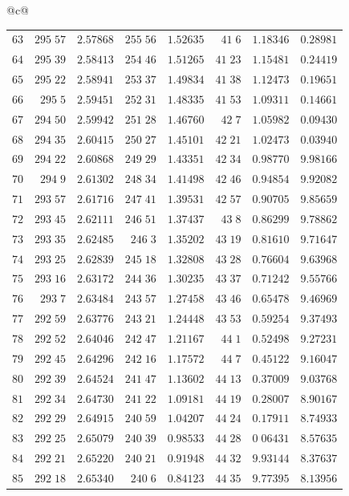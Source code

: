 \begin{center}
{\begin{tabular}{@{}c@{}}
\begin{tabular}{r|r|r|r|r|r|r|r}
$63$&$295\;57$&$2.57868$&$255\;56$&$1.52635$&$41\;6$&$1.18346$&$0.28981$\\
$64$&$295\;39$&$2.58413$&$254\;46$&$1.51265$&$41\;23$&$1.15481$&$0.24419$\\[2pt]
$65$&$295\;22$&$2.58941$&$253\;37$&$1.49834$&$41\;38$&$1.12473$&$0.19651$\\
$66$&$295\;5$&$2.59451$&$252\;31$&$1.48335$&$41\;53$&$1.09311$&$0.14661$\\
$67$&$294\;50$&$2.59942$&$251\;28$&$1.46760$&$42\;7$&$1.05982$&$0.09430$\\
$68$&$294\;35$&$2.60415$&$250\;27$&$1.45101$&$42\;21$&$1.02473$&$0.03940$\\
$69$&$294\;22$&$2.60868$&$249\;29$&$1.43351$&$42\;34$&$0.98770$&$9.98166$\\[2pt]
$70$&$294\;9$&$2.61302$&$248\;34$&$1.41498$&$42\;46$&$0.94854$&$9.92082$\\
$71$&$293\;57$&$2.61716$&$247\;41$&$1.39531$&$42\;57$&$0.90705$&$9.85659$\\
$72$&$293\;45$&$2.62111$&$246\;51$&$1.37437$&$43\;8$&$0.86299$&$9.78862$\\
$73$&$293\;35$&$2.62485$&$246\;3$&$1.35202$&$43\;19$&$0.81610$&$9.71647$\\
$74$&$293\;25$&$2.62839$&$245\;18$&$1.32808$&$43\;28$&$0.76604$&$9.63968$\\[2pt]
$75$&$293\;16$&$2.63172$&$244\;36$&$1.30235$&$43\;37$&$0.71242$&$9.55766$\\
$76$&$293\;7$&$2.63484$&$243\;57$&$1.27458$&$43\;46$&$0.65478$&$9.46969$\\
$77$&$292\;59$&$2.63776$&$243\;21$&$1.24448$&$43\;53$&$0.59254$&$9.37493$\\
$78$&$292\;52$&$2.64046$&$242\;47$&$1.21167$&$44\;1$&$0.52498$&$9.27231$\\
$79$&$292\;45$&$2.64296$&$242\;16$&$1.17572$&$44\;7$&$0.45122$&$9.16047$\\[2pt]
$80$&$292\;39$&$2.64524$&$241\;47$&$1.13602$&$44\;13$&$0.37009$&$9.03768$\\
$81$&$292\;34$&$2.64730$&$241\;22$&$1.09181$&$44\;19$&$0.28007$&$8.90167$\\
$82$&$292\;29$&$2.64915$&$240\;59$&$1.04207$&$44\;24$&$0.17911$&$8.74933$\\
$83$&$292\;25$&$2.65079$&$240\;39$&$0.98533$&$44\;28$&$0\;06431$&$8.57635$\\
$84$&$292\;21$&$2.65220$&$240\;21$&$0.91948$&$44\;32$&$9.93144$&$8.37637$\\[2pt]
$85$&$292\;18$&$2.65340$&$240\;6$&$0.84123$&$44\;35$&$9.77395$&$8.13956$\\

\end{tabular}
\end{tabular}}
\end{center}
